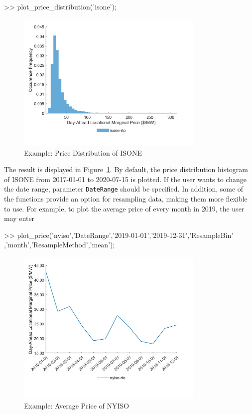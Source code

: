 \documentclass[10pt]{article}
\numberwithin{equation}{section}
\numberwithin{table}{section}
\numberwithin{figure}{section}
\begin{document}
\begin{Command}
>> plot_price_distribution('isone');
\end{Command}

\begin{figure}
  \centering
  \noindent\includegraphics[width=0.8\textwidth]{figures/visualization_example1.jpg}
  \caption{Example: Price Distribution of ISONE} \label{fig:vis_eg1}
\end{figure}

The result is displayed in Figure~\ref{fig:vis_eg1}. By default, the price distribution histogram of ISONE from 2017-01-01 to 2020-07-15 is plotted. If the user wants to change the date range, parameter \verb!DateRange! should be specified. In addition, some of the functions provide an option for resampling data, making them more flexible to use. For example, to plot the average price of every month in 2019, the user may enter

\begin{Command}
 >> plot_price('nyiso','DateRange',{'2019-01-01','2019-12-31'},'ResampleBin'
    ,'month','ResampleMethod','mean');
\end{Command}

\begin{figure}
  \centering
  \noindent\includegraphics[width=0.8\textwidth]{figures/visualization_example2.jpg}
  \caption{Example: Average Price of NYISO} \label{fig:vis_eg2}
\end{figure}
\end{document}
